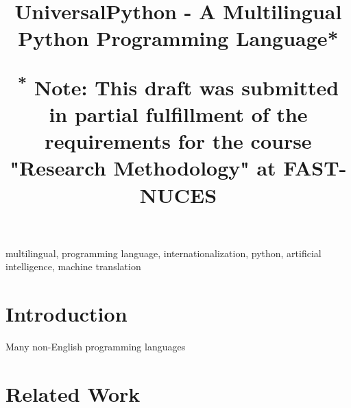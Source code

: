 \documentclass[conference]{IEEEtran}
\begin{document}
\title{UniversalPython - A Multilingual Python Programming Language*\\
{\footnotesize \textsuperscript{*}
Note: This draft was submitted in partial fulfillment of the requirements for the course "Research Methodology"
at FAST-NUCES

}
}

\author{
}

\maketitle

\begin{abstract}
\end{abstract}

\begin{IEEEkeywords}
multilingual, programming language, internationalization, python, artificial intelligence, machine translation
\end{IEEEkeywords}

\section{Introduction}

Many non-English programming languages \cite{Wiki_NonEnglish}

\section{Related Work}
\end{document}
